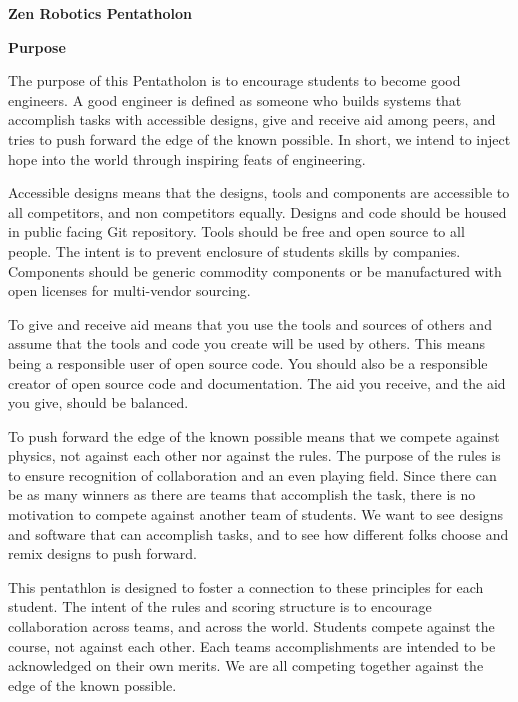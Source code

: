 \documentclass{article}
\begin{document}
	
{\huge \textbf{Zen Robotics Pentatholon}}

\vspace{1cm}


\vspace{1cm}

{\huge \textbf{Purpose}}
\vspace{1cm}

The purpose of this Pentatholon is to encourage students to become good engineers. A good engineer is defined as someone who builds systems that accomplish tasks with accessible designs, give and receive aid among peers, and tries to push forward the edge of the known possible. In short, we intend to inject hope into the world through inspiring feats of engineering.

Accessible designs means that the designs, tools and components are accessible to all competitors, and non competitors equally. Designs and code should be housed in public facing Git repository. Tools should be free and open source to all people. The intent is to prevent enclosure of students skills by companies.  Components should be generic commodity components or be manufactured with open licenses for multi-vendor sourcing.  

To give and receive aid means that you use the tools and sources of others and assume that the tools and code you create will be used by others. This means being a responsible user of open source code. You should also be a responsible creator of open source code and documentation. The aid you receive, and the aid you give, should be  balanced. 

To push forward the edge of the known possible means that we compete against physics, not against each other nor against the rules. The purpose of the rules is to ensure recognition of collaboration and an even playing field. Since there can be as many winners as there are teams that accomplish the task, there is no motivation to compete against another team of students. We want to see designs and software that can accomplish tasks, and to see how different folks choose and remix designs to push forward. 

  
This pentathlon is designed to foster a connection to these principles for each student. The intent of the rules and scoring structure is to encourage collaboration across teams, and across the world. Students compete against the course, not against each other. Each teams accomplishments are intended to be acknowledged on their own merits. We are all competing together against the edge of the known possible.
\pagebreak
\end{document}
